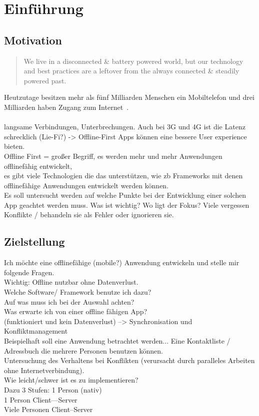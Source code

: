 \chapter{\label{chap:einleitung}Einführung}
\section{Motivation}
\begin{quote}
	We live in a disconnected \& battery powered world, but our technology and best practices are a leftover from the always connected \& steadily powered past.
	\cite{offlinefirst}
\end{quote}

Heutzutage besitzen mehr als fünf Milliarden Menschen ein Mobiltelefon und drei Milliarden haben Zugang zum Internet~\cite{dev-report}.\\\\
langsame Verbindungen, Unterbrechungen. Auch bei 3G und 4G ist die Latenz schrecklich (Lie-Fi?) -> Offline-First Apps können eine bessere User experience bieten.\\
Offline First = großer Begriff, es werden mehr und mehr Anwendungen offlinefähig entwickelt,\\
es gibt viele Technologien die das unterstützen, wie zb Frameworks mit denen offlinefähige Anwendungen entwickelt werden können.\\
Es soll untersucht werden auf welche Punkte bei der Entwicklung einer solchen App geachtet werden muss.
Was ist wichtig? Wo ligt der Fokus? Viele vergessen Konflikte / behandeln sie als Fehler oder ignorieren sie.
\section{Zielstellung}
Ich möchte eine offlinefähige (mobile?) Anwendung entwickeln und stelle mir folgende Fragen. \\
Wichtig: Offline nutzbar ohne Datenverlust.\\
Welche Software/ Framework benutze ich dazu?\\
Auf was muss ich bei der Auswahl achten?\\
Was erwarte ich von einer offline fähigen App?\\
(funktioniert und kein Datenverlust) --> Synchronisation und Konfliktmanagement\\
Beispielhaft soll eine Anwendung betrachtet werden... Eine Kontaktliste / Adressbuch die mehrere Personen benutzen können.\\
% 
% 
% 
Untersuchung des Verhaltens bei  Konflikten (verursacht durch paralleles Arbeiten ohne Internetverbindung).\\
Wie leicht/schwer ist es zu implementieren?
\\
Dazu 3 Stufen: 1 Person (nativ)\\
1 Person Client---Server\\
Viele Personen Client--Server\\

